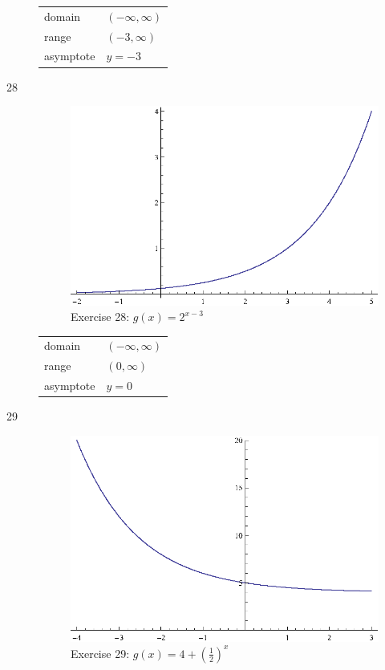 \documentclass{exam}
\begin{document}
\begin{description}
        \begin{tabular}[H]{ll}
          \toprule
          domain    & $(-\infty, \infty)$ \\
          range     & $(-3, \infty)$ \\
          asymptote & $y = -3$ \\
          \bottomrule
        \end{tabular}

      \item[28] 
        \begin{figure}[H]
          \centering
          \includegraphics[scale=0.9]{exercise28.eps}
          \caption*{Exercise 28: $g(x) = 2^{x - 3}$}
        \end{figure}

        \begin{tabular}[H]{ll}
          \toprule
          domain    & $(-\infty, \infty)$ \\
          range     & $(0, \infty)$ \\
          asymptote & $y = 0$ \\
          \bottomrule
        \end{tabular}

      \item[29] 
        \begin{figure}[H]
          \centering
          \includegraphics[scale=0.9]{exercise29.eps}
          \caption*{Exercise 29: $g(x) = 4 + \left( \frac{1}{2} \right)^x$}
        \end{figure}


\end{description}
\end{document}
